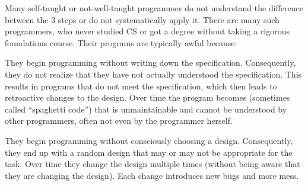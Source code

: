 Many self-taught or not-well-taught programmer do not understand the difference between the $3$ steps or do not systematically apply it.
There are many such programmers, who never studied CS or got a degree without taking a rigorous foundations course.
Their programs are typically awful because:
\begin{compactitem}
 \item They begin programming without writing down the specification.
 Consequently, they do not realize that they have not actually understood the specification.
 This results in programs that do not meet the specification, which then leads to retroactive changes to the design.
 Over time the program becomes (sometimes called ``spaghetti code'') that is unmaintainable and cannot be understood by other programmers, often not even by the programmer herself.
 \item They begin programming without consciously choosing a design.
 Consequently, they end up with a random design that may or may not be appropriate for the task.
 Over time they change the design multiple times (without being aware that they are changing the design).
 Each change introduces new bugs and more mess.
\end{compactitem}

